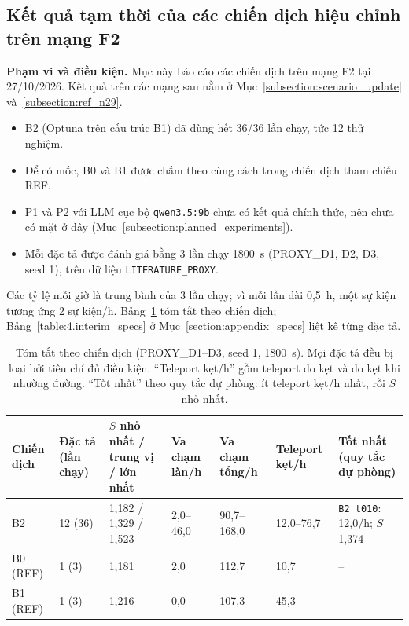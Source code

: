 \documentclass[../DoAn.tex]{subfiles}
\begin{document}
\subsection{Kết quả tạm thời của các chiến dịch hiệu chỉnh trên mạng F2}
\label{subsection:interim}

\textbf{Phạm vi và điều kiện.} Mục này báo cáo các chiến dịch trên mạng F2 tại 27/10/2026. Kết quả trên các mạng sau nằm ở Mục~\ref{subsection:scenario_update} và~\ref{subsection:ref_n29}.
\begin{itemize}
    \item B2 (Optuna trên cấu trúc B1) đã dùng hết 36/36 lần chạy, tức 12 thử nghiệm.
    \item Để có mốc, B0 và B1 được chấm theo cùng cách trong chiến dịch tham chiếu REF.
    \item P1 và P2 với LLM cục bộ \texttt{qwen3.5:9b} chưa có kết quả chính thức, nên chưa có mặt ở đây (Mục~\ref{subsection:planned_experiments}).
    \item Mỗi đặc tả được đánh giá bằng 3 lần chạy 1800~s (PROXY\_D1, D2, D3, seed 1), trên dữ liệu \texttt{LITERATURE\_PROXY}.
\end{itemize}
Các tỷ lệ mỗi giờ là trung bình của 3 lần chạy; vì mỗi lần dài 0,5~h, một sự kiện tương ứng 2 sự kiện/h. Bảng~\ref{table:4.interim_summary} tóm tắt theo chiến dịch; Bảng~\ref{table:4.interim_specs} ở Mục~\ref{section:appendix_specs} liệt kê từng đặc tả.

\begin{table}[H]
\centering
\small\setlength{\tabcolsep}{3pt}
\caption{Tóm tắt theo chiến dịch (PROXY\_D1--D3, seed 1, 1800~s). Mọi đặc tả đều bị loại bởi tiêu chí đủ điều kiện. ``Teleport kẹt/h'' gồm teleport do kẹt và do kẹt khi nhường đường. ``Tốt nhất'' theo quy tắc dự phòng: ít teleport kẹt/h nhất, rồi $S$ nhỏ nhất.}
\label{table:4.interim_summary}
\begin{tabular}{|p{1.5cm}|p{1.5cm}|p{2.6cm}|p{1.5cm}|p{1.7cm}|p{1.5cm}|p{2.6cm}|}
\hline
\textbf{Chiến dịch} & \textbf{Đặc tả (lần chạy)} & \textbf{$S$ nhỏ nhất / trung vị / lớn nhất} & \textbf{Va chạm làn/h} & \textbf{Va chạm tổng/h} & \textbf{Teleport kẹt/h} & \textbf{Tốt nhất (quy tắc dự phòng)} \\ \hline
B2 & 12 (36) & 1,182 / 1,329 / 1,523 & 2,0--46,0 & 90,7--168,0 & 12,0--76,7 & \texttt{B2\_\allowbreak t010}: 12,0/h; $S$ 1,374 \\ \hline
B0 (REF) & 1 (3) & 1,181 & 2,0 & 112,7 & 10,7 & -- \\ \hline
B1 (REF) & 1 (3) & 1,216 & 0,0 & 107,3 & 45,3 & -- \\ \hline
\end{tabular}
\end{table}
\end{document}

